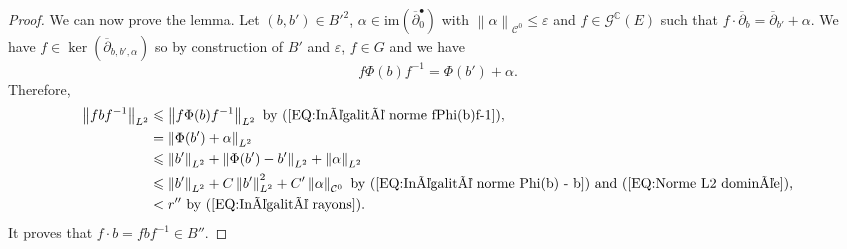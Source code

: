 \documentclass{article}
\theoremstyle{remark}
\theoremstyle{definition}
\newcommand{\C}{\mathbb{C}}
\newcommand{\im}{\mathrm{im}}
\newcommand{\norme}[1]{\left\| #1 \right\|}
\newcommand{\G}{\mathcal{G}}
\newcommand{\mC}{\mathcal{C}}
\newcommand{\dbar}{\overline{\partial}}
\renewcommand{\leq}{\leqslant}
\begin{document}
\begin{proof}
We can now prove the lemma. Let $(b,b') \in {B'}^2$, $\alpha \in \im(\dbar_0^\bullet)$ with $\norme{\alpha}_{\mC^0} \leq \varepsilon$ and $f \in \G^\C(E)$ such that $f \cdot \dbar_b = \dbar_{b'} + \alpha$. We have $f \in \ker(\dbar_{b,b',\alpha})$ so by construction of $B'$ and $\varepsilon$, $f \in G$ and we have
$$
f\Phi(b)f^{-1} = \Phi(b') + \alpha.
$$
Therefore,
\begin{align*}
    \norme{fbf^{-1}}_{L^2} & \leq \norme{f\Phi(b)f^{-1}}_{L^2} \textrm{ by (\ref{EQ:Inégalité norme fPhi(b)f-1}),}\\
    & = \norme{\Phi(b') + \alpha}_{L^2}\\
    & \leq \norme{b'}_{L^2} + \norme{\Phi(b') - b'}_{L^2} + \norme{\alpha}_{L^2}\\
    & \leq \norme{b'}_{L^2} + C\norme{b'}_{L^2}^2 + C'\norme{\alpha}_{\mC^0} \textrm{ by (\ref{EQ:Inégalité norme Phi(b) - b}) and (\ref{EQ:Norme L2 dominée}),}\\
    & < r'' \textrm{ by (\ref{EQ:Inégalité rayons}).}
\end{align*}
It proves that $f \cdot b = fbf^{-1} \in B''$.
\end{proof}
\end{document}
